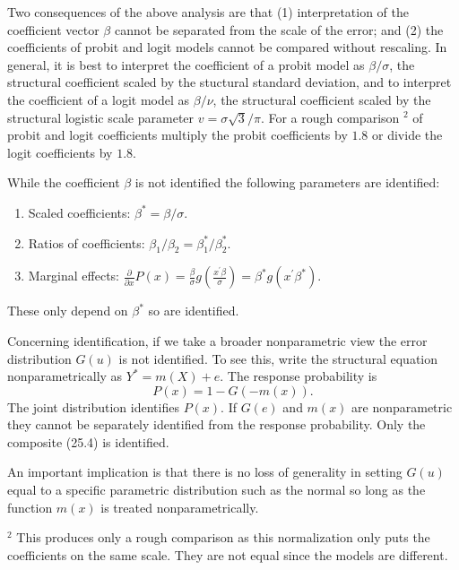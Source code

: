 \documentclass[10pt]{article}
\begin{document}
Two consequences of the above analysis are that (1) interpretation of the coefficient vector $\beta$ cannot be separated from the scale of the error; and (2) the coefficients of probit and logit models cannot be compared without rescaling. In general, it is best to interpret the coefficient of a probit model as $\beta / \sigma$, the structural coefficient scaled by the stuctural standard deviation, and to interpret the coefficient of a logit model as $\beta / \nu$, the structural coefficient scaled by the structural logistic scale parameter $v=\sigma \sqrt{3} / \pi$. For a rough comparison ${ }^{2}$ of probit and logit coefficients multiply the probit coefficients by $1.8$ or divide the logit coefficients by $1.8$.

While the coefficient $\beta$ is not identified the following parameters are identified:

\begin{enumerate}
  \item Scaled coefficients: $\beta^{*}=\beta / \sigma$.

  \item Ratios of coefficients: $\beta_{1} / \beta_{2}=\beta_{1}^{*} / \beta_{2}^{*}$.

  \item Marginal effects: $\frac{\partial}{\partial x} P(x)=\frac{\beta}{\sigma} g\left(\frac{x^{\prime} \beta}{\sigma}\right)=\beta^{*} g\left(x^{\prime} \beta^{*}\right)$.

\end{enumerate}
These only depend on $\beta^{*}$ so are identified.

Concerning identification, if we take a broader nonparametric view the error distribution $G(u)$ is not identified. To see this, write the structural equation nonparametrically as $Y^{*}=m(X)+e$. The response probability is
$$
P(x)=1-G(-m(x)) .
$$
The joint distribution identifies $P(x)$. If $G(e)$ and $m(x)$ are nonparametric they cannot be separately identified from the response probability. Only the composite (25.4) is identified.

An important implication is that there is no loss of generality in setting $G(u)$ equal to a specific parametric distribution such as the normal so long as the function $m(x)$ is treated nonparametrically.

${ }^{2}$ This produces only a rough comparison as this normalization only puts the coefficients on the same scale. They are not equal since the models are different.
\end{document}
